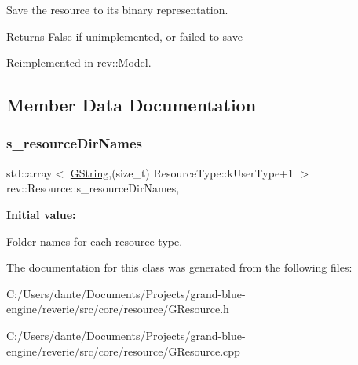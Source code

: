 Save the resource to its binary representation. 

\begin{DoxyReturn}{Returns}
False if unimplemented, or failed to save 
\end{DoxyReturn}


Reimplemented in \mbox{\hyperlink{classrev_1_1_model_a2ca39792d2c6fbd73ca726a6145041ad}{rev\+::\+Model}}.



\subsection{Member Data Documentation}
\mbox{\label{classrev_1_1_resource_afff0a0a41f7c96949c1d0bdd5f8d0380}} 
\subsubsection{\texorpdfstring{s\_resourceDirNames}{s\_resourceDirNames}}
{\footnotesize\ttfamily std\+::array$<$ \mbox{\hyperlink{classrev_1_1_g_string}{G\+String}},(size\+\_\+t) Resource\+Type\+::k\+User\+Type+1 $>$ rev\+::\+Resource\+::s\+\_\+resource\+Dir\+Names\hspace{0.3cm}{\ttfamily [static]}, {\ttfamily [protected]}}

{\bfseries Initial value\+:}
\begin{DoxyCode}{0}
\DoxyCodeLine{=}
\DoxyCodeLine{\{ \{}
\DoxyCodeLine{    \textcolor{stringliteral}{"images"},}
\DoxyCodeLine{    \textcolor{stringliteral}{"textures"},}
\DoxyCodeLine{    \textcolor{stringliteral}{"materials"},}
\DoxyCodeLine{    \textcolor{stringliteral}{"meshes"},}
\DoxyCodeLine{    \textcolor{stringliteral}{"cube\_textures"},}
\DoxyCodeLine{    \textcolor{stringliteral}{"animations"},}
\DoxyCodeLine{    \textcolor{stringliteral}{"models"},}
\DoxyCodeLine{    \textcolor{stringliteral}{"shaders"},}
\DoxyCodeLine{    \textcolor{stringliteral}{"scripts"},}
\DoxyCodeLine{    \textcolor{stringliteral}{"skeletons"},}
\DoxyCodeLine{    \textcolor{stringliteral}{"audio"}}
\DoxyCodeLine{\} \}}

\end{DoxyCode}


Folder names for each resource type. 



The documentation for this class was generated from the following files\+:\begin{DoxyCompactItemize}
\item 
C\+:/\+Users/dante/\+Documents/\+Projects/grand-\/blue-\/engine/reverie/src/core/resource/G\+Resource.\+h\item 
C\+:/\+Users/dante/\+Documents/\+Projects/grand-\/blue-\/engine/reverie/src/core/resource/G\+Resource.\+cpp\end{DoxyCompactItemize}
